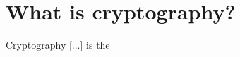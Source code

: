 \section{What is cryptography?}

\begin{displayquote}
    Cryptography [...] is the
\end{displayquote}
